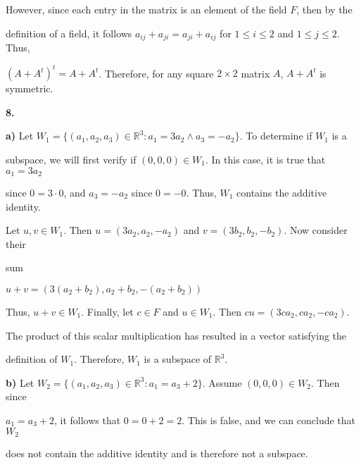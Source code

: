 \documentclass[12pt, a4paper]{article}
\begin{document}
\vspace{6mm}

\par However, since each entry in the matrix is an element of the field $F$, then by the\par definition of a field, it follows $a_{ij}+a_{ji}=a_{ji}+a_{ij}$ for $1\leq i\leq 2$ and $1\leq j\leq 2$. Thus, \par $(A+A^t)^t=A+A^t$. Therefore, for any square $2\times 2$ matrix $A$, $A+A^t$ is symmetric.\par

\hspace{150mm}\blacksquare

\newpage

\noindent\textbf{8.}

\vspace{2mm}

\par\textbf{a)} Let $W_1=\{(a_1,a_2,a_3)\in\mathbb{R}^3\colon a_1=3a_2\wedge a_3=-a_2\}$. To determine if $W_1$ is a \par subspace, we will first verify if $(0,0,0)\in W_1$. In this case, it is true that $a_1=3a_2$\par since $0=3\cdot 0$, and $a_3=-a_2$ since $0=-0$. Thus, $W_1$ contains the additive identity.\par Let $u,v\in W_1$. Then $u=(3a_2, a_2, -a_2)$ and $v=(3b_2,b_2,-b_2)$. Now consider their \par sum

\vspace{2mm}

 
 \centerline{$u+v = (3(a_2+b_2), a_2+b_2,-(a_2+b_2))$}
 
 \vspace{4mm}
 
 \par Thus, $u+v\in W_1$. Finally, let $c\in F$ and $u\in W_1$. Then $cu = (3ca_2,ca_2, -ca_2)$. \par The product of this scalar multiplication has resulted in a vector satisfying the \par definition of $W_1$. Therefore, $W_1$ is a subspace of $\mathbb{R}^3$.
 
 \vspace{4mm}
 
 \par\textbf{b)} Let $W_2=\{(a_1,a_2,a_3)\in\mathbb{R}^3\colon a_1=a_3+2\}$. Assume $(0,0,0)\in W_2$. Then since\par $a_1=a_3+2$, it follows that $0=0+2=2$. This is false, and we can conclude that $W_2$ \par does not contain the additive identity and is therefore not a subspace.
 
\end{document}
